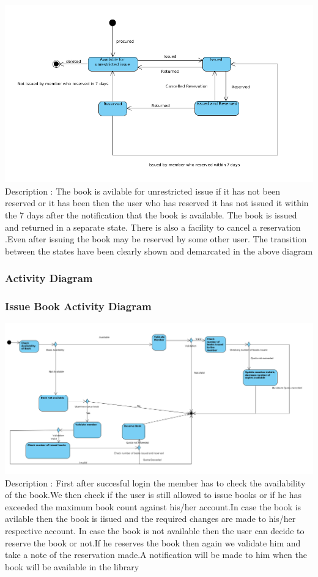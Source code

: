\documentclass[a4paper]{article}
\begin{document}
\includegraphics[scale=0.50]{images/stateDiagIssue.png}
\\
Description : The book is avilable for unrestricted issue if it has not been reserved or it has been then the user who has reserved it has not issued it within the 7 days after the notification that the book is available. The book is issued and returned in a separate state. There is also a facility to cancel a reservation .Even after issuing the book may be reserved by some other user. The transition between the states have been clearly shown and demarcated in the above diagram


\subsubsection{Activity Diagram}
\subsubsection*{Issue Book Activity Diagram}
\includegraphics[scale=0.50]{images/activityDiagIssue.png}
\\
Description : First after succesful login the member has to check the availability of the book.We then check if the user is still allowed to issue books or if he has exceeded the maximum book count against his/her account.In case the book is avilable then the book is iisued and the required changes are made to his/her respective account. In case the book is not available then the user can decide to reserve the book or not.If he reserves the book then again we validate him and take a note of the reservation made.A notification will be made to him when the book will be available in the library
\end{document}
